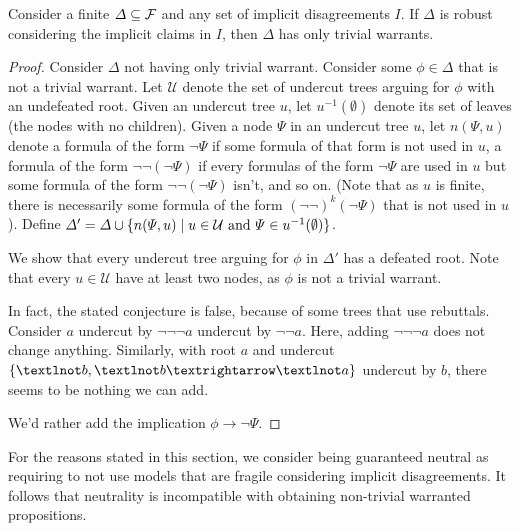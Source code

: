 \documentclass[version=3.21, pagesize, twoside=off, bibliography=totoc, DIV=calc, fontsize=12pt, a4paper, french, english]{scrartcl}
\begin{document}
\begin{conjecture}
	Consider a finite $\Delta \subseteq \mathcal{F}$ and any set of implicit disagreements $I$. If $\Delta$ is robust considering the implicit claims in $I$, then $\Delta$ has only trivial warrants.
\end{conjecture}
\begin{proof}
	Consider $\Delta$ not having only trivial warrant. Consider some $\phi \in \Delta$ that is not a trivial warrant. 
	Let $\mathcal{U}$ denote the set of undercut trees arguing for $\phi$ with an undefeated root. 
	Given an undercut tree $u$, let $u^{-1}(\emptyset)$ denote its set of leaves (the nodes with no children).
	Given a node $\Psi$ in an undercut tree $u$, let $n(\Psi, u)$ denote a formula of the form $¬\Psi$ if some formula of that form is not used in $u$, a formula of the form $¬¬(¬\Psi)$ if every formulas of the form $¬\Psi$ are used in $u$ but some formula of the form $¬¬(¬\Psi)$ isn’t, and so on. (Note that as $u$ is finite, there is necessarily some formula of the form $(¬¬)^k(¬\Psi)$ that is not used in $u$).
	Define $\Delta' = \Delta \cup \set{n(\Psi, u) \suchthat u \in \mathcal{U} \text{ and } \Psi \in u^{-1}(\emptyset)}$.
	 
	We show that every undercut tree arguing for $\phi$ in $\Delta'$ has a defeated root.
	Note that every $u \in \mathcal{U}$ have at least two nodes, as $\phi$ is not a trivial warrant.
	
	In fact, the stated conjecture is false, because of some trees that use rebuttals. Consider $a$ undercut by $¬¬¬a$ undercut by $¬¬a$. Here, adding $¬¬¬a$ does not change anything. Similarly, with root $a$ and undercut $\set{¬b, ¬b → ¬a}$ undercut by $b$, there seems to be nothing we can add.
	
	We’d rather add the implication $\phi → ¬\Psi$.
\end{proof}
	
For the reasons stated in this section, we consider being guaranteed neutral as requiring to not use models that are fragile considering implicit disagreements. It follows that neutrality is incompatible with obtaining non-trivial warranted propositions.
\end{document}
